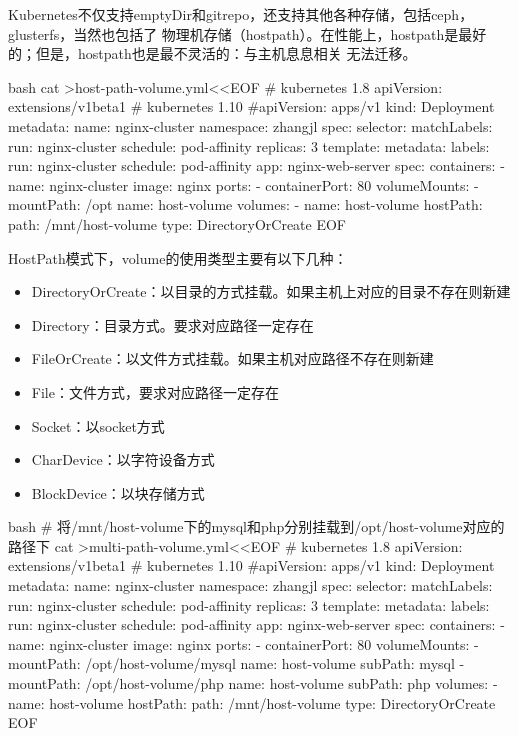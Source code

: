 Kubernetes不仅支持emptyDir和gitrepo，还支持其他各种存储，包括ceph，glusterfs，当然也包括了
物理机存储（hostpath）。在性能上，hostpath是最好的；但是，hostpath也是最不灵活的：与主机息息相关
无法迁移。
\begin{code-block}{bash}
cat >host-path-volume.yml<<EOF
# kubernetes 1.8
apiVersion: extensions/v1beta1
# kubernetes 1.10
#apiVersion: apps/v1
kind: Deployment
metadata:
  name: nginx-cluster
  namespace: zhangjl
spec:
  selector:
    matchLabels:
      run: nginx-cluster
      schedule: pod-affinity
  replicas: 3
  template:
    metadata:
      labels:
        run: nginx-cluster
        schedule: pod-affinity
        app: nginx-web-server
    spec:
      containers:
      - name: nginx-cluster
        image: nginx
        ports:
        - containerPort: 80
        volumeMounts:
          - mountPath: /opt
            name: host-volume
      volumes:
      - name: host-volume
        hostPath:
          path: /mnt/host-volume
          type: DirectoryOrCreate
EOF
\end{code-block}
HostPath模式下，volume的使用类型主要有以下几种：
\begin{itemize}
  \item DirectoryOrCreate：以目录的方式挂载。如果主机上对应的目录不存在则新建
  \item Directory：目录方式。要求对应路径一定存在
  \item FileOrCreate：以文件方式挂载。如果主机对应路径不存在则新建
  \item File：文件方式，要求对应路径一定存在
  \item Socket：以socket方式
  \item CharDevice：以字符设备方式
  \item BlockDevice：以块存储方式
\end{itemize}

\begin{code-block}{bash}
# 将/mnt/host-volume下的mysql和php分别挂载到/opt/host-volume对应的路径下
cat >multi-path-volume.yml<<EOF
# kubernetes 1.8
apiVersion: extensions/v1beta1
# kubernetes 1.10
#apiVersion: apps/v1
kind: Deployment
metadata:
  name: nginx-cluster
  namespace: zhangjl
spec:
  selector:
    matchLabels:
      run: nginx-cluster
      schedule: pod-affinity
  replicas: 3
  template:
    metadata:
      labels:
        run: nginx-cluster
        schedule: pod-affinity
        app: nginx-web-server
    spec:
      containers:
      - name: nginx-cluster
        image: nginx
        ports:
        - containerPort: 80
        volumeMounts:
          - mountPath: /opt/host-volume/mysql
            name: host-volume
            subPath: mysql
          - mountPath: /opt/host-volume/php
            name: host-volume
            subPath: php
      volumes:
      - name: host-volume
        hostPath:
          path: /mnt/host-volume
          type: DirectoryOrCreate
EOF
\end{code-block}